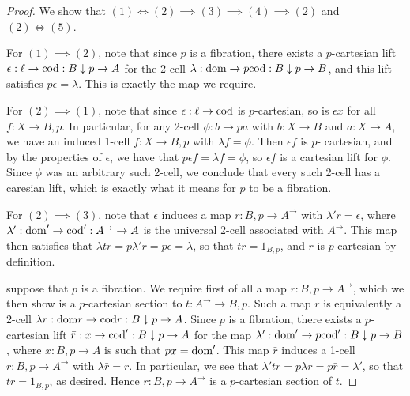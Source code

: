 \documentclass[../thesis.tex]{subfiles}
\begin{document}
\begin{proof}
  We show that $(1) \iff (2) \implies (3) \implies (4) \implies (2)$ and $(2) \iff (5)$.

  For $(1) \implies (2)$, note that since $p$ is a fibration, there exists a $p$-cartesian lift $\epsilon : \ell
  \to {\mathrm{cod}} : B \mathrel{\downarrow} p \to A$ for the 2-cell $\lambda : {\mathrm{dom}} \to p{\mathrm{cod}} : B \mathrel{\downarrow} p \to B$, and this lift
  satisfies $p\epsilon = \lambda$. This is exactly the map we require.

  For $(2) \implies (1)$, note that since $\epsilon : \ell \to {\mathrm{cod}}$ is $p$-cartesian, so is $\epsilon x$ for
  all $f : X \to B \comma p$. In particular, for any 2-cell $\phi : b \to pa$ with $b : X \to B$ and $a : X
  \to A$, we have an induced 1-cell $f : X \to B \comma p$ with $\lambda f = \phi$. Then $\epsilon f$ is $p$-%
  cartesian, and by the properties of $\epsilon$, we have that $p\epsilon f = \lambda f = \phi$, so $\epsilon f$
  is a cartesian lift for $\phi$. Since $\phi$ was an arbitrary such 2-cell, we conclude that every such 2-cell
  has a caresian lift, which is exactly what it means for $p$ to be a fibration.


  For $(2) \implies (3)$, note that $\epsilon$ induces a map $r : B \comma p \to A^\to$ with $\lambda'r =
  \epsilon$, where $\lambda' : {\mathrm{dom}}' \to {\mathrm{cod}}' : A^\to \to A$ is the universal 2-cell associated with $A^\to$.
  This map then satisfies that $\lambda tr = p\lambda' r = p\epsilon = \lambda$, so that $tr = 1_{B \comma p}$,
  and $r$ is $p$-cartesian by definition.

  suppose that $p$ is a fibration. We require first of all a map $r : B \comma p \to
  A^\to$, which we then show is a $p$-cartesian section to $t : A^\to \to B \comma p$. Such a map $r$ is
  equivalently a 2-cell $\lambda r : {\mathrm{dom}} r \to {\mathrm{cod}} r : B \mathrel{\downarrow} p \to A$. Since $p$ is a fibration, there
  exists a $p$-cartesian lift $\bar r : x \to {\mathrm{cod}}' : B \mathrel{\downarrow} p \to A$ for the map $\lambda' : {\mathrm{dom}}' \to p
  {\mathrm{cod}}' : B \mathrel{\downarrow} p \to B$, where $x : B \comma p \to A$ is such that $px = {\mathrm{dom}}'$. This map $\bar r$ induces
  a 1-cell $r : B \comma p \to A^\to$ with $\lambda \bar r = r$. In particular, we see that $\lambda' t r =
  p\lambda r = p\bar r = \lambda'$, so that $tr = 1_{B \comma p}$, as desired. Hence $r : B \comma p \to A^\to$
  is a $p$-cartesian section of $t$.


\end{proof}
\end{document}
